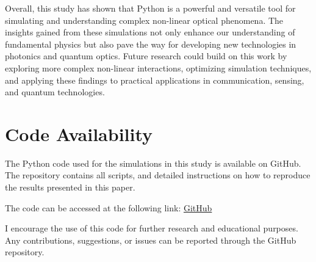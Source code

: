 \documentclass[12pt]{article}
\begin{document}
Overall, this study has shown that Python is a powerful and versatile tool for simulating and understanding complex non-linear optical phenomena. The insights gained from these simulations not only enhance our understanding of fundamental physics but also pave the way for developing new technologies in photonics and quantum optics. Future research could build on this work by exploring more complex non-linear interactions, optimizing simulation techniques, and applying these findings to practical applications in communication, sensing, and quantum technologies.

\newpage

\section{Code Availability}

The Python code used for the simulations in this study is available on GitHub. The repository contains all scripts, and detailed instructions on how to reproduce the results presented in this paper.

The code can be accessed at the following link: \href{https://github.com/HeisenbergK/NLO}{GitHub}

I encourage the use of this code for further research and educational purposes. Any contributions, suggestions, or issues can be reported through the GitHub repository.

\nocite{*}

\end{document}
